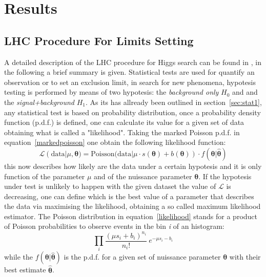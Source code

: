 
\section{Results}
\label{sec:result}

\subsection{LHC Procedure For Limits Setting}
\label{sec:limits}
A detailed description of the LHC procedure for Higgs search can be found in \cite{lhc,cramer},
in the following a brief summary is given.
Statistical tests are used for quantify an observation or to set an exclusion limit, 
in search for new phenomena, hypotesis testing is performed by means of two hypotesis: 
the \textit{background only} $H_0$ and and the \textit{signal+background} $H_1$.  
As its has allready been outlined in section~\ref{sec:stat1}, any statistical test is based on probability
distribution, once a probability density function (p.d.f.) is defined, one can calculate its value for a given 
set of data obtaining what is called a "likelihood".  Taking the marked Poisson
p.d.f. in equation~\eqref{markedpoisson}  one obtain the following likelihood function:
\begin{equation}\label{likelihood}
\mathcal{L}(\text{data}|\mu, \boldsymbol{\theta}) = \text{Poisson(data} | \mu \cdot s(\boldsymbol{\theta}) + b(\boldsymbol{\theta})) 
	\cdot f(\boldsymbol{\theta} | \hat{\boldsymbol{\theta}})
\end{equation}
this now describes how likely are the data under a certain hypotesis and it is only function of the parameter $\mu$ and of the
nuissance parameter $\boldsymbol{\theta}$. If the hypotesis under test is unlikely to happen with the given dataset the value of 
$\mathcal{L}$ is decreasing,
one can define which is the best value of a parameter that describes the data via maximising the likelihood,
obtaining a so called maximum likelihood estimator. The Poisson distribution in equation~\eqref{likelihood}
stands for a product of Poisson probabilities to observe  events in the bin \textit{i} of an histogram:
$$
\prod_{i} \frac{(\mu s_i +b_i)^{n_i}}{n_i!} ~ e^{-\mu s_i -b_i}
$$
while the $f(\boldsymbol{\theta} | \hat{\boldsymbol{\theta}})$ is the p.d.f. for a given set of nuissance 
parameter $\boldsymbol{\theta}$ with their best estimate $\hat{\boldsymbol{\theta}}$. 

